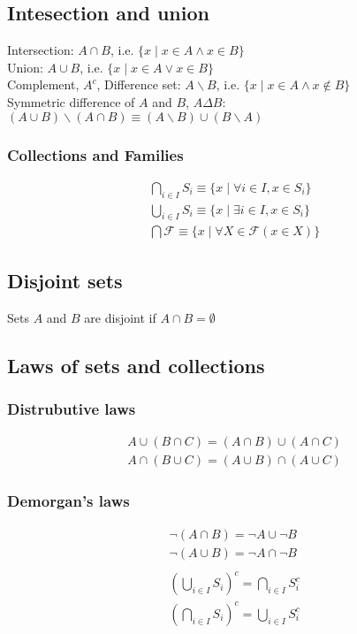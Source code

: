 \documentclass{article}
\begin{document}
\subsection{Intesection and union}
Intersection: \(A\cap B\), i.e. \(\{x\mid x\in A\wedge x\in B\}\)\\
Union: \(A\cup B\), i.e. \(\{x\mid x\in A \vee x\in B\}\)\\
Complement, \(A^{c}\), Difference set: \(A\backslash  B\), i.e. \(\{x\mid x\in A\wedge x\notin B\}\)\\
Symmetric difference of \(A\) and \(B\), \(A\Delta B\): \((A\cup B)\backslash(A\cap B)\equiv (A\backslash B)\cup(B\backslash A)\)
\subsubsection{Collections and Families}
\begin{align*}
	&\bigcap_{i\in I}S_i\equiv\{x\mid\forall i\in I,x\in S_i\}\\
	&\bigcup_{i\in I}S_i\equiv\{x\mid\exists i\in I,x\in S_i\}\\
	&\bigcap\mathscr{F}\equiv\{x\mid\forall X\in\mathscr{F}(x\in X)\}
\end{align*}
\subsection{Disjoint sets}
Sets \(A\) and \(B\) are disjoint if \(A\cap B=\emptyset\)
\subsection{Laws of sets and collections}
\subsubsection{Distrubutive laws}
\begin{align*}
	&A\cup(B\cap C)=(A\cap B)\cup(A\cap C)\\
	&A\cap(B\cup C)=(A\cup B)\cap(A\cup C)
\end{align*}
\subsubsection{Demorgan's laws}
\begin{align*}
	&\neg(A\cap B)=\neg A\cup \neg B\\
	&\neg(A\cup B)=\neg A\cap \neg B\\\\
	&\left(\bigcup_{i\in I}S_i\right)^{c}=\bigcap_{i\in I}S_{i}^{c}\\
	&\left(\bigcap_{i\in I}S_i\right)^{c}=\bigcup_{i\in I}S_{i}^{c}
\end{align*}
\end{document}
